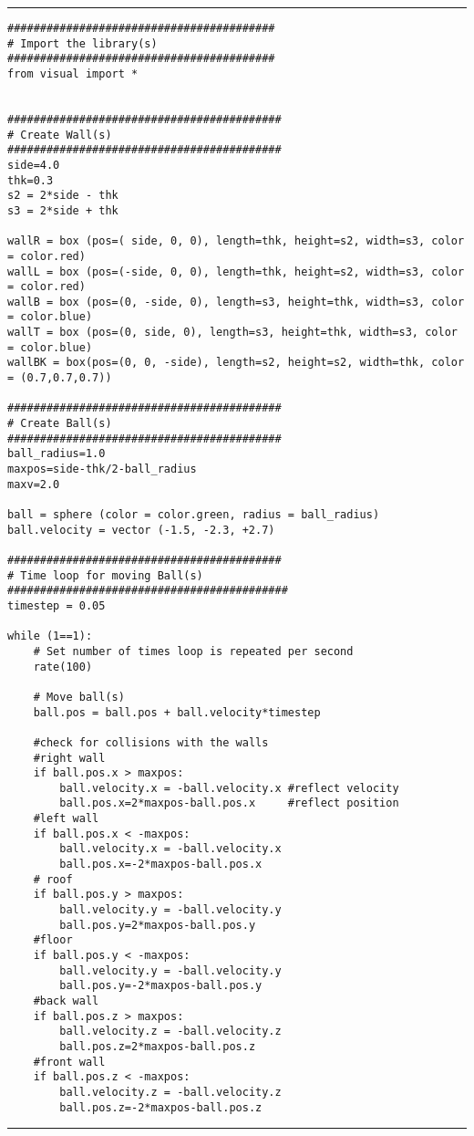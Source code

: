 \documentclass[a4]{article}
\begin{document}
{\color{code}\hrule
\begin{verbatim}
#########################################
# Import the library(s)
#########################################
from visual import *


##########################################
# Create Wall(s)
##########################################
side=4.0
thk=0.3
s2 = 2*side - thk
s3 = 2*side + thk

wallR = box (pos=( side, 0, 0), length=thk, height=s2, width=s3, color = color.red)
wallL = box (pos=(-side, 0, 0), length=thk, height=s2, width=s3, color = color.red)
wallB = box (pos=(0, -side, 0), length=s3, height=thk, width=s3, color = color.blue)
wallT = box (pos=(0, side, 0), length=s3, height=thk, width=s3, color = color.blue)
wallBK = box(pos=(0, 0, -side), length=s2, height=s2, width=thk, color = (0.7,0.7,0.7))

##########################################
# Create Ball(s)
##########################################
ball_radius=1.0
maxpos=side-thk/2-ball_radius
maxv=2.0

ball = sphere (color = color.green, radius = ball_radius)
ball.velocity = vector (-1.5, -2.3, +2.7)

##########################################
# Time loop for moving Ball(s)
###########################################
timestep = 0.05

while (1==1):
    # Set number of times loop is repeated per second
    rate(100)

    # Move ball(s)
    ball.pos = ball.pos + ball.velocity*timestep

    #check for collisions with the walls
    #right wall
    if ball.pos.x > maxpos:
        ball.velocity.x = -ball.velocity.x #reflect velocity
        ball.pos.x=2*maxpos-ball.pos.x     #reflect position
    #left wall
    if ball.pos.x < -maxpos:
        ball.velocity.x = -ball.velocity.x
        ball.pos.x=-2*maxpos-ball.pos.x
    # roof
    if ball.pos.y > maxpos:
        ball.velocity.y = -ball.velocity.y
        ball.pos.y=2*maxpos-ball.pos.y
    #floor
    if ball.pos.y < -maxpos:
        ball.velocity.y = -ball.velocity.y
        ball.pos.y=-2*maxpos-ball.pos.y
    #back wall
    if ball.pos.z > maxpos:
        ball.velocity.z = -ball.velocity.z
        ball.pos.z=2*maxpos-ball.pos.z
    #front wall
    if ball.pos.z < -maxpos:
        ball.velocity.z = -ball.velocity.z
        ball.pos.z=-2*maxpos-ball.pos.z

\end{verbatim}\hrule}

\end{document}
